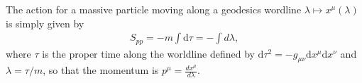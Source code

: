 \documentclass[../geometry_main.tex]{subfiles}
\begin{document}
\begin{mytheorem}
\end{mytheorem}

\begin{mytheorem}
\end{mytheorem}







{\color{red}

\begin{mytheorem}
The action for a massive particle moving along a geodesics wordline $\lambda \mapsto x^\mu(\lambda)$ is simply given by
\begin{align}
    S_{pp}=-m\int \mathrm{d}\tau = -\int d\lambda,
\end{align}
where $\tau$ is the proper time along the worldline defined by $\mathrm{d}\tau^2 = - g_{\mu\nu} \mathrm{d}x^\mu \mathrm{d}x^\nu$ and $\lambda =\tau/m$, so that the momentum is $p^\mu = \frac{dx^\mu}{d\lambda}$.


\end{mytheorem}}
\end{document}
